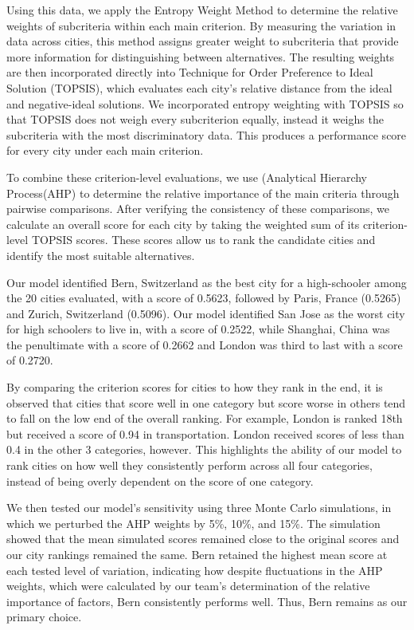 \documentclass[11pt,letterpaper]{article}
\begin{document}
Using this data, we apply the Entropy Weight Method to determine the relative weights of subcriteria within each main criterion. By measuring the variation in data across cities, this method assigns greater weight to subcriteria that provide more information for distinguishing between alternatives. The resulting weights are then incorporated directly into Technique for Order Preference to Ideal Solution (TOPSIS), which evaluates each city's relative distance from the ideal and negative-ideal solutions. We incorporated entropy weighting with TOPSIS so that TOPSIS does not weigh every subcriterion equally, instead it weighs the subcriteria with the most discriminatory data. This produces a performance score for every city under each main criterion.

To combine these criterion-level evaluations, we use (Analytical Hierarchy Process(AHP) to determine the relative importance of the main criteria through pairwise comparisons. After verifying the consistency of these comparisons, we calculate an overall score for each city by taking the weighted sum of its criterion-level TOPSIS scores. These scores allow us to rank the candidate cities and identify the most suitable alternatives.

Our model identified Bern, Switzerland as the best city for a high-schooler among the 20 cities evaluated, with a score of 0.5623, followed by Paris, France (0.5265) and Zurich, Switzerland (0.5096). Our model identified San Jose as the worst city for high schoolers to live in, with a score of 0.2522, while Shanghai, China was the penultimate with a score of 0.2662 and London was third to last with a score of 0.2720.

By comparing the criterion scores for cities to how they rank in the end, it is observed that cities that score well in one category but score worse in others tend to fall on the low end of the overall ranking. For example, London is ranked 18th but received a score of 0.94 in transportation. London received scores of less than 0.4 in the other 3 categories, however. This highlights the ability of our model to rank cities on how well they consistently perform across all four categories, instead of being overly dependent on the score of one category.

We then tested our model's sensitivity using three Monte Carlo simulations, in which we perturbed the AHP weights by 5\%, 10\%, and 15\%. The simulation showed that the mean simulated scores remained close to the original scores and our city rankings remained the same. Bern retained the highest mean score at each tested level of variation, indicating how despite fluctuations in the AHP weights, which were calculated by our team's determination of the relative importance of factors, Bern consistently performs well. Thus, Bern remains as our primary choice.
\par
\endgroup
\clearpage
\end{document}
